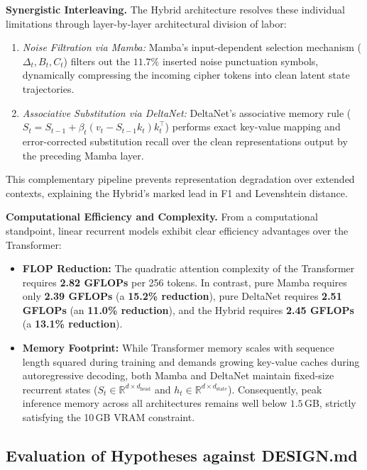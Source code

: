 \documentclass[12pt,a4paper]{article}
\begin{document}
\textbf{Synergistic Interleaving.} The Hybrid architecture resolves these individual limitations through layer-by-layer architectural division of labor:
\begin{enumerate}
\item \emph{Noise Filtration via Mamba:} Mamba's input-dependent selection mechanism ($\Delta_t, B_t, C_t$) filters out the $11.7\%$ inserted noise punctuation symbols, dynamically compressing the incoming cipher tokens into clean latent state trajectories.
\item \emph{Associative Substitution via DeltaNet:} DeltaNet's associative memory rule ($S_t = S_{t-1} + \beta_t(v_t - S_{t-1}k_t)k_t^\top$) performs exact key-value mapping and error-corrected substitution recall over the clean representations output by the preceding Mamba layer.
\end{enumerate}
This complementary pipeline prevents representation degradation over extended contexts, explaining the Hybrid's marked lead in F1 and Levenshtein distance.

\textbf{Computational Efficiency and Complexity.} From a computational standpoint, linear recurrent models exhibit clear efficiency advantages over the Transformer:
\begin{itemize}
\item \textbf{FLOP Reduction:} The quadratic attention complexity of the Transformer requires \textbf{2.82 GFLOPs} per 256 tokens. In contrast, pure Mamba requires only \textbf{2.39 GFLOPs} (a \textbf{15.2\% reduction}), pure DeltaNet requires \textbf{2.51 GFLOPs} (an \textbf{11.0\% reduction}), and the Hybrid requires \textbf{2.45 GFLOPs} (a \textbf{13.1\% reduction}).
\item \textbf{Memory Footprint:} While Transformer memory scales with sequence length squared during training and demands growing key-value caches during autoregressive decoding, both Mamba and DeltaNet maintain fixed-size recurrent states ($S_t \in \mathbb{R}^{d \times d_{\text{head}}}$ and $h_t \in \mathbb{R}^{d \times d_{\text{state}}}$). Consequently, peak inference memory across all architectures remains well below $1.5$\,GB, strictly satisfying the 10\,GB VRAM constraint.
\end{itemize}

\subsection{Evaluation of Hypotheses against DESIGN.md}
\end{document}
